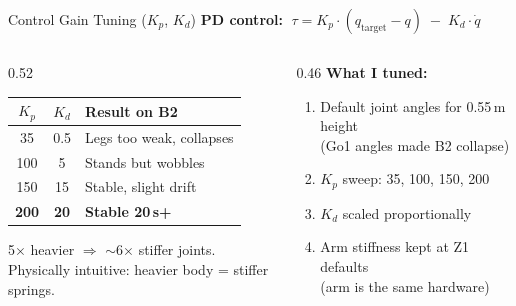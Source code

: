 \documentclass[10pt,aspectratio=169]{beamer}
\begin{document}

\begin{frame}{Control Gain Tuning ($K_p$, $K_d$)}
  \textbf{PD control:}
  $\;\tau = K_p \cdot (q_{\text{target}} - q) \;-\; K_d \cdot \dot{q}$

  \vspace{6pt}
  \begin{columns}[T]
    \begin{column}{0.52\textwidth}
      \begin{table}
        \centering\small
        \begin{tabular}{c c l}
          \toprule
          $K_p$ & $K_d$ & \textbf{Result on B2} \\
          \midrule
          35  & 0.5 & Legs too weak, collapses \\
          100 & 5   & Stands but wobbles \\
          150 & 15  & Stable, slight drift \\
          \textbf{200} & \textbf{20} & \textbf{Stable 20\,s+} \\
          \bottomrule
        \end{tabular}
      \end{table}

      \vspace{4pt}
      {\small 5$\times$ heavier $\Rightarrow$ $\sim$6$\times$ stiffer joints.\\
      Physically intuitive: heavier body = stiffer springs.}
    \end{column}
    \begin{column}{0.46\textwidth}
      \textbf{What I tuned:}
      \begin{enumerate}
        \item Default joint angles for 0.55\,m height\\
              (Go1 angles made B2 collapse)
        \item $K_p$ sweep: 35, 100, 150, 200
        \item $K_d$ scaled proportionally
        \item Arm stiffness kept at Z1 defaults\\
              (arm is the same hardware)
      \end{enumerate}
    \end{column}
  \end{columns}
\end{frame}
\end{document}

